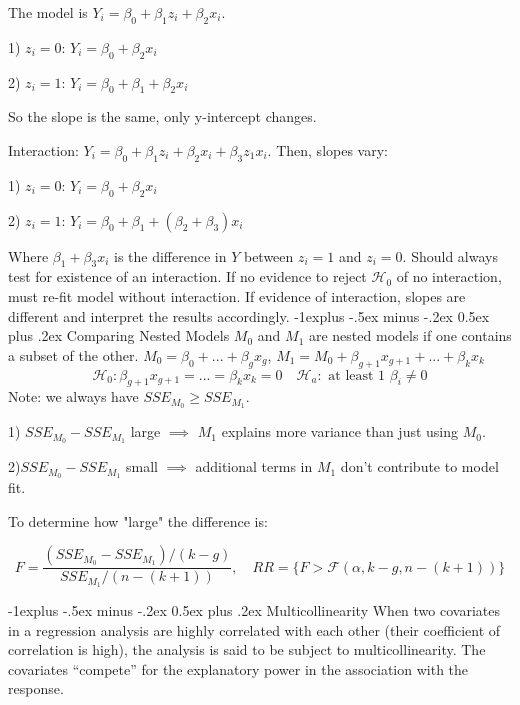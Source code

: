 \documentclass[5pt,landscape]{article}
\makeatletter
\renewcommand{\subsection}{\@startsection{subsection}{2}{0mm}%
                                {-1explus -.5ex minus -.2ex}%
                                {0.5ex plus .2ex}%
                                {\normalfont\normalsize\bfseries}}
\makeatother
\begin{document}
\begin{multicols}{3}
The model is $Y_i = \beta_0 + \beta_1z_i + \beta_2 x_i$. 

1) $z_i = 0$: $Y_i = \beta_0 + \beta_2x_i$

2) $z_i = 1$: $Y_i = \beta_0 + \beta_1 + \beta_2x_i$

So the slope is the same, only y-intercept changes.

Interaction: $Y_i = \beta_0 + \beta_1z_i + \beta_2 x_i + \beta_3 z_1 x_i$. Then, slopes vary:

1) $z_i = 0$: $Y_i = \beta_0 + \beta_2x_i$

2) $z_i = 1$: $Y_i = \beta_0 + \beta_1 + (\beta_2 + \beta_3)x_i$

Where $\beta_1 + \beta_3 x_i$ is the difference in $Y$ between $z_i=1$ and $z_i = 0$. Should always test for existence of an interaction.
If no evidence to reject $\mathcal{H}_0$ of no interaction, must re-fit model without interaction.
If evidence of interaction, slopes are different and interpret the results accordingly.
\subsection{Comparing Nested Models}
$M_0$ and $M_1$ are nested models if one contains a subset of the other.
$M_0 = \beta_0+...+ \beta_gx_g$, $M_1 = M_0+ \beta_{g+1}x_{g+1}+...+\beta_kx_k$
$$\mathcal{H}_0: \beta_{g+1}x_{g+1} = ...=\beta_kx_k=0 \quad \mathcal{H}_a : \text{ at least 1 } \beta_i\neq 0$$
Note: we always have $SSE_{M_0}\geq SSE_{M_1} $. 

1) $SSE_{M_0}- SSE_{M_1} $ large $\implies$ $M_1$ explains more variance than just using $M_0$.

2)$SSE_{M_0}- SSE_{M_1} $ small $\implies$ additional terms in $M_1$ don't contribute to model fit.

To determine how "large" the difference is:

$$F = \frac{(SSE_{M_0}- SSE_{M_1}) /(k-g)}{SSE_{M_1} / (n - (k+1))}, \quad RR = \{F > \mathcal{F}(\alpha,k-g, n-(k+1)) \}$$

\subsection{Multicollinearity} 
When two covariates in a regression analysis are highly correlated with each other (their coefficient of correlation is high), the analysis is said to be subject to multicollinearity. The covariates “compete” for the explanatory power in the association with the response.


\end{multicols}
\end{document}
